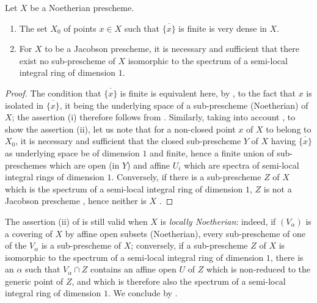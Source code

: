 \begin{proposition}[10.5.5]
\label{IV.10.5.5}
Let $X$ be a Noetherian prescheme.
\begin{enumerate}[label=(\roman*)]
  \item The set $X_0$ of points $x\in X$ such that $\overline{\{x\}}$ is finite is very dense in $X$.
  \item For $X$ to be a Jacobson prescheme, it is necessary and sufficient that there exist no sub-prescheme of $X$ isomorphic to the spectrum of a semi-local integral ring of dimension $1$.
\end{enumerate}
\end{proposition}

\begin{proof}
The condition that $\overline{\{x\}}$ is finite is equivalent here, by , to the fact that $x$ is isolated in $\overline{\{x\}}$, it being the underlying space of a sub-prescheme (Noetherian) of $X$; the assertion (i) therefore follows from .
Similarly, taking into account , to show the assertion (ii), let us note that for a non-closed point $x$ of $X$ to belong to $X_0$, it is necessary and sufficient that the closed sub-prescheme $Y$ of $X$ having $\overline{\{x\}}$ as underlying space be of dimension $1$ and finite, hence a finite union of sub-preschemes which are open (in $Y$) and affine $U_i$ which are spectra of semi-local integral rings of dimension $1$.
Conversely, if there is a sub-prescheme $Z$ of $X$ which is the spectrum of a semi-local integral ring of dimension $1$, $Z$ is not a Jacobson prescheme , hence neither is $X$ .
\end{proof}


\begin{remark}[10.5.6]
\label{IV.10.5.6}
The assertion (ii) of  is still valid when $X$ is \emph{locally Noetherian}: indeed, if $(V_\alpha)$ is a covering of $X$ by affine open subsets (Noetherian), every sub-prescheme of one of the $V_\alpha$ is a sub-prescheme of $X$; conversely, if a sub-prescheme $Z$ of $X$ is isomorphic to the spectrum of a semi-local integral ring of dimension $1$, there is an $\alpha$ such that $V_\alpha\cap Z$ contains an affine open $U$ of $Z$ which is non-reduced to the generic point of $Z$, and which is therefore also the spectrum of a semi-local integral ring of dimension $1$.
We conclude by .
\end{remark}


